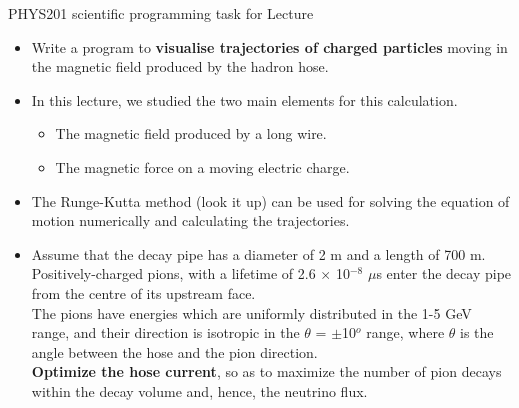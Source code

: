 {\begin{frame}{PHYS201 scientific programming task for Lecture \thislecture}
\begin{itemize}
  \item Write a program to {\bf visualise trajectories of charged particles}
        moving in the magnetic field produced by the hadron hose.
  \vspace{0.3cm}
  \item In this lecture, we studied the two main elements for this calculation.
        \begin{itemize}
          \item The magnetic field produced by a long wire.
          \item The magnetic force on a moving electric charge.
        \end{itemize}
  \item The Runge-Kutta method (look it up) can be used for solving the equation
        of motion numerically and calculating the trajectories.
  \vspace{0.3cm}
  \item Assume that the decay pipe has a diameter of 2 m and a length of 700 m.
        Positively-charged pions, with a lifetime of 2.6 $\times$ 10$^{-8}$ $\mu$s
        enter the decay pipe from the centre of its upstream face.\\
        The pions have energies which are uniformly distributed in the 1-5 GeV range,
        and their direction is isotropic in the $\theta$ = $\pm$10$^{o}$ range,
        where $\theta$ is the angle between the hose and the pion direction.\\
        {\bf Optimize the hose current}, so as to maximize the number of pion decays
        within the decay volume and, hence, the neutrino flux.
\end{itemize}

\end{frame}


} %



%
%

\renewcommand{\lecturesummarytitle}{Main points to remember }


%
%

